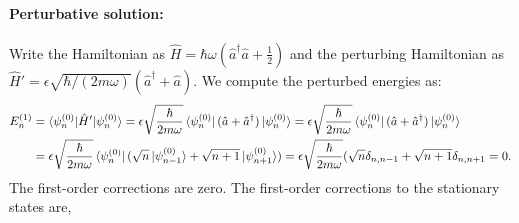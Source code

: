 \documentclass[10pt]{article}
\newcommand{\1}{\mathbf 1}
\begin{document}
\paragraph{Perturbative solution:}
Write the Hamiltonian as $\hat H = \hbar \omega (\hat a^\dagger \hat a + \frac{1}{2})$ and the perturbing Hamiltonian as $\hat H' = \epsilon\sqrt{\hbar / (2m \omega)} (\hat a^\dagger + \hat a)$.
We compute the perturbed energies as:
\begin{align}
	E^{(1)}_n
	&=\nonumber
	\braket{\psi_n^{(0)}|\hat H'| \psi_n^{(0)}}
	=
	\epsilon
	\sqrt{\frac{\hbar}{2m\omega}}
	\bra{\psi_n^{(0)}}
	(\hat a + \hat a^\dagger)
	\ket{\psi_n^{(0)}}
	=
	\epsilon
	\sqrt{\frac{\hbar}{2m\omega}}
	\bra{\psi_n^{(0)}}
	(\hat a + \hat a^\dagger)
	\ket{\psi_n^{(0)}}
	\\
	&=
	\epsilon
	\sqrt{\frac{\hbar}{2m\omega}}
	\bra{\psi_n^{(0)}}
	(\sqrt{n} \ket{\psi_{n-1}^{(0)}}+ \sqrt{n+1}\ket{\psi_{n+1}^{(0)}})
	=
	\epsilon
	\sqrt{\frac{\hbar}{2m\omega}}
	(\sqrt{n} \delta_{n,n-1}+ \sqrt{n+1}
	\delta_{n,n+1}
	=
	0.
\end{align}
The first-order corrections are zero.
The first-order corrections to the stationary states are,
\end{document}
